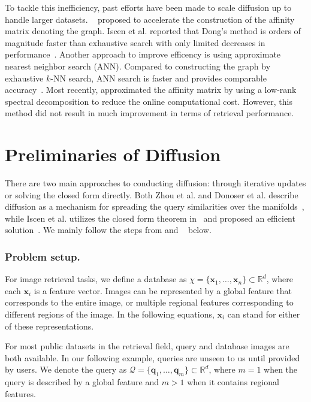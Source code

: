 \documentclass[letterpaper]{article} \usepackage{aaai19}  \usepackage{times}  \usepackage{helvet}  \usepackage{courier}  \usepackage{url}  \usepackage{graphicx}  \frenchspacing  \setlength{\pdfpagewidth}{8.5in}  \setlength{\pdfpageheight}{11in}
\begin{document}
To tackle this inefficiency, past efforts have been made to scale diffusion up to handle larger datasets.
~\cite{dong2011efficient} proposed to accelerate the construction of the affinity matrix denoting the graph.
Iscen et al. reported that Dong's method is orders of magnitude faster than exhaustive search with only limited decreases in performance~\cite{iscen2017efficient}.
Another approach to improve efficency is using approximate nearest neighbor search (ANN).
Compared to constructing the graph by exhaustive $k$-NN search, ANN search is faster and provides comparable accuracy~\cite{jegou2011product,ge2014optimized}.
Most recently, \cite{iscen2018fast} approximated the affinity matrix by using a low-rank spectral decomposition to reduce the online computational cost.
However, this method did not result in much improvement in terms of retrieval performance.


\section{Preliminaries of Diffusion}
\label{sec:preliminaries}

There are two main approaches to conducting diffusion: through iterative updates or solving the closed form directly.
Both Zhou et al. and Donoser et al. describe diffusion as a mechanism for spreading the query similarities over the manifolds~\cite{zhou2004ranking,donoser2013diffusion},
while Iscen et al. utilizes the closed form theorem in~\cite{zhou2004ranking} and proposed an efficient solution~\cite{iscen2017efficient}.
We mainly follow the steps from \cite{zhou2004learning} and ~\cite{iscen2017efficient} below.

\subsubsection{Problem setup.}

For image retrieval tasks, we define a database as $\chi=\{\mathbf{x}_1,\dots,\mathbf{x}_n\}\subset\mathbb{R}^d$, where each $\mathbf{x}_i$ is a feature vector.
Images can be represented by a global feature that corresponds to the entire image, or multiple regional features corresponding to different regions of the image.
In the following equations, $\mathbf{x}_i$ can stand for either of these representations.

For most public datasets in the retrieval field, query and database images are both available.
In our following example, queries are unseen to us until provided by users.
We denote the query as $\mathcal{Q}=\{\mathbf{q}_1,\dots,\mathbf{q}_m\}\subset\mathbb{R}^d$, where $m=1$ when the query is described by a global feature and $m>1$ when it contains regional features.
\end{document}
